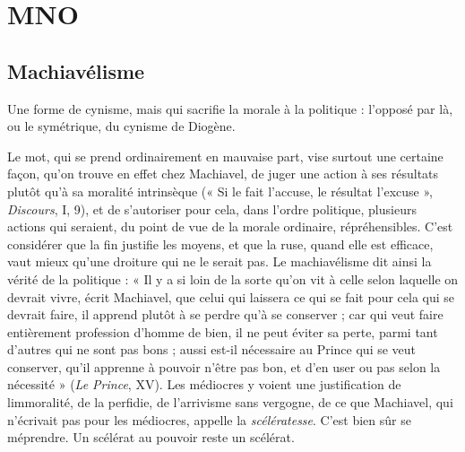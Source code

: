 
\chapter{MNO}

\section{Machiavélisme}
Une forme de cynisme, mais qui sacrifie la morale à la
politique : l'opposé par là, ou le symétrique, du cynisme
de Diogène.

Le mot, qui se prend ordinairement en mauvaise part, vise surtout une certaine
façon, qu’on trouve en effet chez Machiavel, de juger une action à ses
résultats plutôt qu’à sa moralité intrinsèque (« Si le fait l’accuse, le résultat
l’excuse », {\it Discours}, I, 9), et de s’autoriser pour cela, dans l’ordre politique, plusieurs
actions qui seraient, du point de vue de la morale ordinaire, répréhensibles.
C’est considérer que la fin justifie les moyens, et que la ruse, quand elle
est efficace, vaut mieux qu’une droiture qui ne le serait pas. Le machiavélisme
dit ainsi la vérité de la politique : « Il y a si loin de la sorte qu’on vit à celle selon
laquelle on devrait vivre, écrit Machiavel, que celui qui laissera ce qui se fait
pour cela qui se devrait faire, il apprend plutôt à se perdre qu’à se conserver ;
car qui veut faire entièrement profession d'homme de bien, il ne peut éviter sa
perte, parmi tant d’autres qui ne sont pas bons ; aussi est-il nécessaire au Prince
qui se veut conserver, qu’il apprenne à pouvoir n'être pas bon, et d’en user ou
pas selon la nécessité » ({\it Le Prince}, XV). Les médiocres y voient une justification
de limmoralité, de la perfidie, de l’arrivisme sans vergogne, de ce que
Machiavel, qui n’écrivait pas pour les médiocres, appelle la {\it scélératesse}. C’est
bien sûr se méprendre. Un scélérat au pouvoir reste un scélérat.

